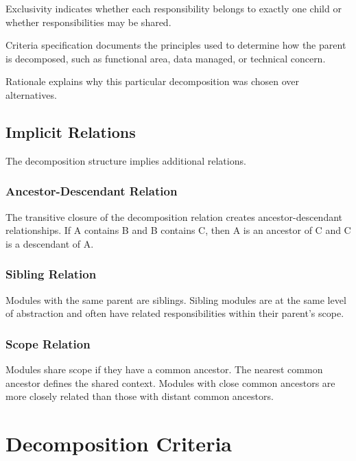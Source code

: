 \documentclass[11pt]{article}
\begin{document}
Exclusivity indicates whether each responsibility belongs to exactly one child or whether responsibilities may be shared.

Criteria specification documents the principles used to determine how the parent is decomposed, such as functional area, data managed, or technical concern.

Rationale explains why this particular decomposition was chosen over alternatives.

\subsection{Implicit Relations}

The decomposition structure implies additional relations.

\subsubsection{Ancestor-Descendant Relation}

The transitive closure of the decomposition relation creates ancestor-descendant relationships. If A contains B and B contains C, then A is an ancestor of C and C is a descendant of A.

\subsubsection{Sibling Relation}

Modules with the same parent are siblings. Sibling modules are at the same level of abstraction and often have related responsibilities within their parent's scope.

\subsubsection{Scope Relation}

Modules share scope if they have a common ancestor. The nearest common ancestor defines the shared context. Modules with close common ancestors are more closely related than those with distant common ancestors.

\section{Decomposition Criteria}
\end{document}
